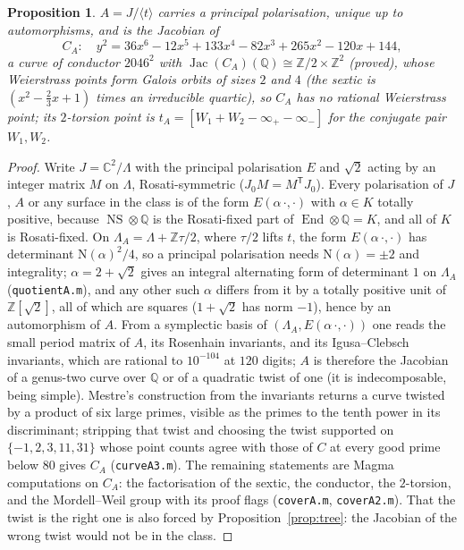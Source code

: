 \documentclass[11pt,reqno]{amsart}
\theoremstyle{plain}
\newtheorem{proposition}[theorem]{Proposition}
\theoremstyle{definition}
\DeclareMathOperator{\Jac}{Jac}
\DeclareMathOperator{\End}{End}
\DeclareMathOperator{\NS}{NS}
\newcommand{\Q}{\mathbb{Q}}
\newcommand{\Z}{\mathbb{Z}}
\begin{document}
\begin{proposition}\label{prop:CA}
$A=J/\langle t\rangle$ carries a principal polarisation, unique up to automorphisms, and is the
Jacobian of
\[
  C_A:\quad y^2=36x^6-12x^5+133x^4-82x^3+265x^2-120x+144,
\]
a curve of conductor $2046^2$ with $\Jac(C_A)(\Q)\cong\Z/2\times\Z^2$ (proved), whose Weierstrass
points form Galois orbits of sizes $2$ and $4$ (the sextic is $(x^2-\tfrac23x+1)$ times an
irreducible quartic), so $C_A$ has no rational Weierstrass point; its $2$-torsion point is
$t_A=[W_1+W_2-\infty_+-\infty_-]$ for the conjugate pair $W_1,W_2$.
\end{proposition}
\begin{proof}
Write $J=\mathbb C^2/\Lambda$ with the principal polarisation $E$ and $\sqrt2$ acting by an integer
matrix $M$ on $\Lambda$, Rosati-symmetric ($J_0M=M^{\mathsf T}J_0$). Every polarisation of $J$, $A$ or
any surface in the class is of the form $E(\alpha\,\cdot,\cdot)$ with $\alpha\in K$ totally positive,
because $\NS\otimes\Q$ is the Rosati-fixed part of $\End\otimes\Q=K$, and all of $K$ is Rosati-fixed.
On $\Lambda_A=\Lambda+\Z\tau/2$, where $\tau/2$ lifts $t$, the form $E(\alpha\,\cdot,\cdot)$ has
determinant $\mathrm N(\alpha)^2/4$, so a principal polarisation needs $\mathrm N(\alpha)=\pm2$ and
integrality; $\alpha=2+\sqrt2$ gives an integral alternating form of determinant $1$ on $\Lambda_A$
(\texttt{quotientA.m}), and any other such $\alpha$ differs from it by a totally positive unit of
$\Z[\sqrt2]$, all of which are squares ($1+\sqrt2$ has norm $-1$), hence by an automorphism of $A$.
From a symplectic basis of $(\Lambda_A,E(\alpha\,\cdot,\cdot))$ one reads the small period matrix of
$A$, its Rosenhain invariants, and its Igusa--Clebsch invariants, which are rational to $10^{-104}$
at $120$ digits; $A$ is therefore the Jacobian of a genus-two curve over $\Q$ or of a quadratic twist
of one (it is indecomposable, being simple). Mestre's construction from the invariants returns a
curve twisted by a product of six large primes, visible as the primes to the tenth power in its
discriminant; stripping that twist and choosing the twist supported on $\{-1,2,3,11,31\}$ whose
point counts agree with those of $C$ at every good prime below $80$ gives $C_A$ (\texttt{curveA3.m}).
The remaining statements are Magma computations on $C_A$: the factorisation of the sextic, the
conductor, the $2$-torsion, and the Mordell--Weil group with its proof flags (\texttt{coverA.m},
\texttt{coverA2.m}). That the twist is the right one is also forced by Proposition~\ref{prop:tree}:
the Jacobian of the wrong twist would not be in the class.
\end{proof}
\end{document}
